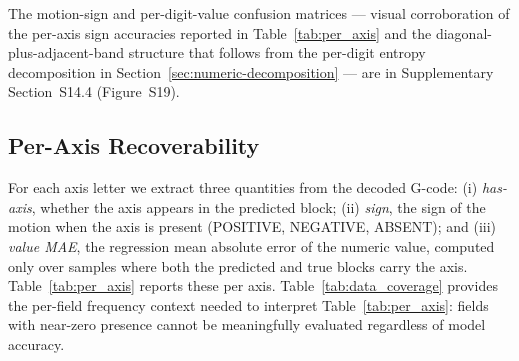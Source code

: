 \documentclass[sensors,article,submit,moreauthors,pdftex]{Definitions/mdpi}
\begin{document}
The motion-sign and per-digit-value confusion matrices --- visual corroboration of the per-axis sign accuracies reported in Table~\ref{tab:per_axis} and the diagonal-plus-adjacent-band structure that follows from the per-digit entropy decomposition in Section~\ref{sec:numeric-decomposition} --- are in Supplementary Section~S14.4 (Figure~S19).

\subsection{Per-Axis Recoverability}
\label{sec:per-axis}

For each axis letter we extract three quantities from the decoded G-code: (i) \emph{has-axis}, whether the axis appears in the predicted block; (ii) \emph{sign}, the sign of the motion when the axis is present (POSITIVE, NEGATIVE, ABSENT); and (iii) \emph{value MAE}, the regression mean absolute error of the numeric value, computed only over samples where both the predicted and true blocks carry the axis. Table~\ref{tab:per_axis} reports these per axis. Table~\ref{tab:data_coverage} provides the per-field frequency context needed to interpret Table~\ref{tab:per_axis}: fields with near-zero presence cannot be meaningfully evaluated regardless of model accuracy.




\end{document}
